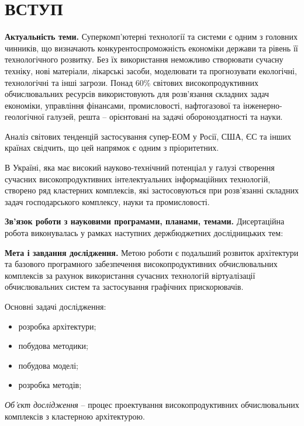 \chapter{ВСТУП}
\textbf{Актуальність теми.} 
Суперкомп’ютерні технології та системи є одним з головних чинників, що визначають конкурентоспроможність економіки держави та рівень її технологічного розвитку. Без їх використання неможливо створювати сучасну техніку, нові матеріали, лікарські засоби, моделювати та прогнозувати екологічні, технологічні та інші загрози. Понад 60\% світових високопродуктивних обчислювальних ресурсів використовують для розв’язання складних задач економіки, управління фінансами, промисловості, нафтогазової та інженерно-геологічної галузей, решта -- орієнтовані на задачі обороноздатності та науки.

Аналіз світових тенденцій застосування супер-ЕОМ у Росії, США, ЄС та інших країнах свідчить, що цей напрямок є одним з пріоритетних. 

В Україні, яка має високий науково-технічний потенціал у галузі створення сучасних високопродуктивних інтелектуальних інформаційних технологій, створено ряд кластерних комплексів, які застосовуються при розв'язанні складних задач господарського комплексу, науки та промисловості.


\textbf{Зв'язок роботи з науковими програмами, планами, темами.}
Дисертаційна робота виконувалась у рамках наступних держбюджетних дослідницьких тем:



\textbf{Мета і завдання дослідження.}
Метою роботи є подальший розвиток архітектури та базового програмного забезпечення високопродуктивних обчислювальних комплексів за рахунок використання сучасних технологій віртуалізації обчислювальних систем та  застосування графічних прискорювачів.

Основні задачі дослідження:
\begin{itemize}
 \item розробка архітектури;
 \item побудова методики;
 \item побудова моделі;
 \item розробка методів;
 \end{itemize}


\textit{Об'єкт дослідження} -- процес проектування високопродуктивних обчислювальних комплексів з кластерною архітектурою.

